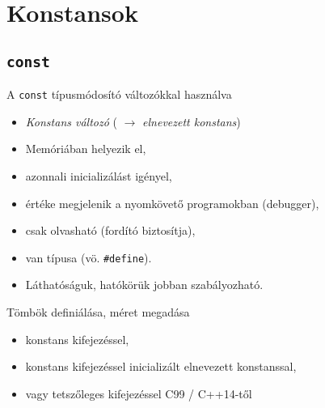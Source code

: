 \section{Konstansok}

\subsection{\texttt{const}}

\begin{frame}
    A \texttt{const} típusmódosító változókkal használva
    \begin{itemize}
        \footnotesize
        \item \emph{Konstans változó} ( $\to$ \emph{elnevezett konstans})
        \item Memóriában helyezik el,
        \item azonnali inicializálást igényel, 
        \item értéke megjelenik a nyomkövető programokban (debugger),
        \item csak olvasható (fordító biztosítja),
        \item van típusa (vö. \texttt{\#define}).
        \item Láthatóságuk, hatókörük jobban szabályozható.
    \end{itemize}
    \vfill
    Tömbök definiálása, méret megadása
    \begin{itemize}
        \footnotesize
        \item konstans kifejezéssel,
        \item konstans kifejezéssel inicializált elnevezett konstanssal,
        \item vagy tetszőleges kifejezéssel C99 / C++14-től
    \end{itemize}
\end{frame}

\begin{frame}
    \begin{exampleblock}{}
        
    \end{exampleblock}
\end{frame}

\begin{frame}
    \begin{exampleblock}{}
        \small
        
    \end{exampleblock}
\end{frame}

